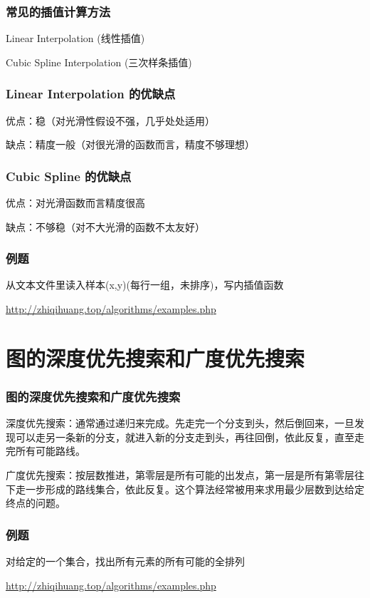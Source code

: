 \documentclass[CJK,14pt]{beamer}
\begin{document}
  \begin{frame}
    \frametitle{常见的插值计算方法}
    \bitem
  \item{Linear Interpolation (线性插值)}
  \item{Cubic Spline Interpolation (三次样条插值)}
    \eitem
  \end{frame}


  \begin{frame}
    \frametitle{Linear Interpolation 的优缺点}
    \bitem
  \item{优点：稳（对光滑性假设不强，几乎处处适用）}
  \item{缺点：精度一般（对很光滑的函数而言，精度不够理想）}
    \eitem
  \end{frame}


  \begin{frame}
    \frametitle{Cubic Spline 的优缺点}
    \bitem
  \item{优点：对光滑函数而言精度很高}
  \item{缺点：不够稳（对不大光滑的函数不太友好）}
    \eitem
  \end{frame}

    \begin{frame}
    \frametitle{例题}
    从文本文件里读入样本(x,y)(每行一组，未排序)，写内插值函数

    \url{http://zhiqihuang.top/algorithms/examples.php}
  \end{frame}

  
  \section{图的深度优先搜索和广度优先搜索}

  \begin{frame}
    \frametitle{图的深度优先搜索和广度优先搜索}
    \bitem
  \item{深度优先搜索：通常通过递归来完成。先走完一个分支到头，然后倒回来，一旦发现可以走另一条新的分支，就进入新的分支走到头，再往回倒，依此反复，直至走完所有可能路线。}
  \item{广度优先搜索：按层数推进，第零层是所有可能的出发点，第一层是所有第零层往下走一步形成的路线集合，依此反复。这个算法经常被用来求用最少层数到达给定终点的问题。}
    \eitem
  \end{frame}

  \begin{frame}
    \frametitle{例题}
    对给定的一个集合，找出所有元素的所有可能的全排列

    \url{http://zhiqihuang.top/algorithms/examples.php}    
  \end{frame}
\end{document}
